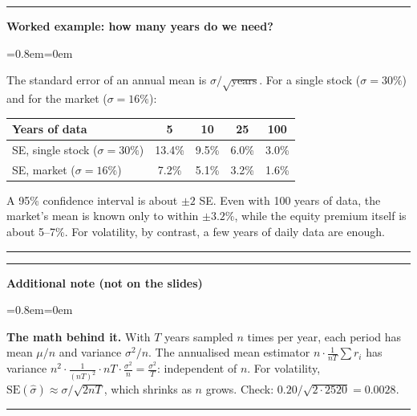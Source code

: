 \documentclass[11pt,a4paper]{report}
\newenvironment{notebox}[1]
  {\par\medskip\Needspace{6\baselineskip}\noindent\rule{\linewidth}{0.4pt}\par\nopagebreak
   \noindent\textbf{#1}\par\nopagebreak
   \begin{list}{}{\leftmargin=0.8em\rightmargin=0em\topsep=2pt}\item[]}
  {\end{list}\nopagebreak\noindent\rule{\linewidth}{0.4pt}\par\medskip}
\newenvironment{addnote}{\begin{notebox}{Additional note (not on the slides)}}{\end{notebox}}
\newenvironment{workedex}[1][]{\begin{notebox}{Worked example#1}}{\end{notebox}}
\begin{document}
\begin{workedex}[: how many years do we need?]
The standard error of an annual mean is $\sigma/\sqrt{\text{years}}$. For a single
stock ($\sigma=30\%$) and for the market ($\sigma=16\%$):
\begin{center}
\begin{tabular}{@{}lcccc@{}}
\toprule
Years of data & 5 & 10 & 25 & 100 \\
\midrule
SE, single stock ($\sigma=30\%$) & 13.4\% & 9.5\% & 6.0\% & 3.0\% \\
SE, market ($\sigma=16\%$) & 7.2\% & 5.1\% & 3.2\% & 1.6\% \\
\bottomrule
\end{tabular}
\end{center}
A 95\% confidence interval is about $\pm2$ SE. Even with 100 years of data, the
market's mean is known only to within $\pm3.2\%$, while the equity premium itself
is about 5--7\%. For volatility, by contrast, a few years of daily data are enough.
\end{workedex}
\begin{addnote}
\textbf{The math behind it.} With $T$ years sampled $n$ times per year, each
period has mean $\mu/n$ and variance $\sigma^2/n$. The annualised mean
estimator $n\cdot\frac{1}{nT}\sum r_i$ has variance
$n^2\cdot\frac{1}{(nT)^2}\cdot nT\cdot\frac{\sigma^2}{n}=\frac{\sigma^2}{T}$:
independent of $n$. For volatility, $\text{SE}(\hat\sigma)\approx
\sigma/\sqrt{2nT}$, which shrinks as $n$ grows. Check:
$0.20/\sqrt{2\cdot 2520}=0.0028$. \checkmark
\end{addnote}
\end{document}
